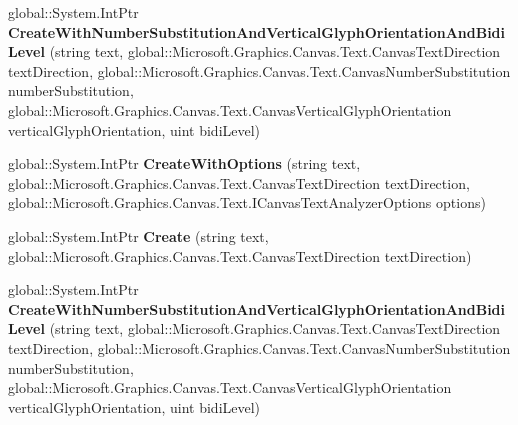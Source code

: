 \begin{DoxyCompactItemize}
global\+::\+System.\+Int\+Ptr {\bfseries Create\+With\+Number\+Substitution\+And\+Vertical\+Glyph\+Orientation\+And\+Bidi\+Level} (string text, global\+::\+Microsoft.\+Graphics.\+Canvas.\+Text.\+Canvas\+Text\+Direction text\+Direction, global\+::\+Microsoft.\+Graphics.\+Canvas.\+Text.\+Canvas\+Number\+Substitution number\+Substitution, global\+::\+Microsoft.\+Graphics.\+Canvas.\+Text.\+Canvas\+Vertical\+Glyph\+Orientation vertical\+Glyph\+Orientation, uint bidi\+Level)
\item 
\mbox{\label{interface_microsoft_1_1_graphics_1_1_canvas_1_1_text_1_1_i_canvas_text_analyzer_factory_a40e77ae7b0745b17858257c35808df74}} 
global\+::\+System.\+Int\+Ptr {\bfseries Create\+With\+Options} (string text, global\+::\+Microsoft.\+Graphics.\+Canvas.\+Text.\+Canvas\+Text\+Direction text\+Direction, global\+::\+Microsoft.\+Graphics.\+Canvas.\+Text.\+I\+Canvas\+Text\+Analyzer\+Options options)
\item 
\mbox{\label{interface_microsoft_1_1_graphics_1_1_canvas_1_1_text_1_1_i_canvas_text_analyzer_factory_aec5674841ed2329598eb2ed3e89170f7}} 
global\+::\+System.\+Int\+Ptr {\bfseries Create} (string text, global\+::\+Microsoft.\+Graphics.\+Canvas.\+Text.\+Canvas\+Text\+Direction text\+Direction)
\item 
\mbox{\label{interface_microsoft_1_1_graphics_1_1_canvas_1_1_text_1_1_i_canvas_text_analyzer_factory_ab3d7e254f0ceac4bdd660a9922c725f7}} 
global\+::\+System.\+Int\+Ptr {\bfseries Create\+With\+Number\+Substitution\+And\+Vertical\+Glyph\+Orientation\+And\+Bidi\+Level} (string text, global\+::\+Microsoft.\+Graphics.\+Canvas.\+Text.\+Canvas\+Text\+Direction text\+Direction, global\+::\+Microsoft.\+Graphics.\+Canvas.\+Text.\+Canvas\+Number\+Substitution number\+Substitution, global\+::\+Microsoft.\+Graphics.\+Canvas.\+Text.\+Canvas\+Vertical\+Glyph\+Orientation vertical\+Glyph\+Orientation, uint bidi\+Level)
\item 
\mbox{\label{interface_microsoft_1_1_graphics_1_1_canvas_1_1_text_1_1_i_canvas_text_analyzer_factory_a40e77ae7b0745b17858257c35808df74}} 

\end{DoxyCompactItemize}
